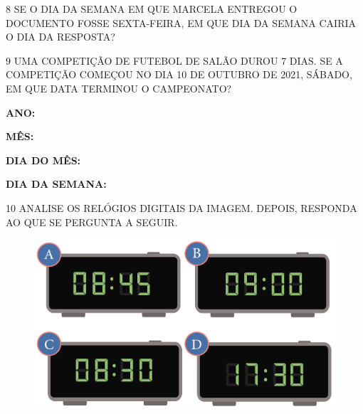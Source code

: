 
\num{8} SE O DIA DA SEMANA EM QUE MARCELA ENTREGOU O DOCUMENTO FOSSE
SEXTA-FEIRA, EM QUE DIA DA SEMANA CAIRIA O DIA DA RESPOSTA?


\num{9} UMA COMPETIÇÃO DE FUTEBOL DE SALÃO DUROU 7 DIAS.
SE A COMPETIÇÃO COMEÇOU NO DIA 10 DE OUTUBRO DE 2021, SÁBADO, EM QUE
DATA TERMINOU O CAMPEONATO?\enlargethispage{2\baselineskip}

\begin{escolha}[itemsep=-2pt]
\item \textbf{ANO:} 

\item \textbf{MÊS:} 

\item \textbf{DIA DO MÊS:} 

\item \textbf{DIA DA SEMANA:} 
\end{escolha}

\num{10} ANALISE OS RELÓGIOS DIGITAIS DA IMAGEM. DEPOIS, RESPONDA AO QUE SE PERGUNTA A SEGUIR.


\begin{figure}[htpb!]
\centering
\includegraphics[width=\textwidth]{./media/SAEB_1ANO_MAT_FIGURA56.png}
\end{figure}

